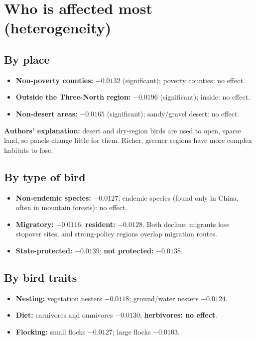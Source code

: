 \documentclass[11pt]{article}
\begin{document}
\section{Who is affected most (heterogeneity)}

\subsection{By place}
\begin{itemize}
\item \textbf{Non-poverty counties:} $-0.0132$ (significant); poverty counties: no effect.
\item \textbf{Outside the Three-North region:} $-0.0196$ (significant); inside: no effect.
\item \textbf{Non-desert areas:} $-0.0165$ (significant); sandy/gravel desert: no effect.
\end{itemize}
\textbf{Authors' explanation:} desert and dry-region birds are used to open, sparse land, so panels change little for them. Richer, greener regions have more complex habitats to lose.

\subsection{By type of bird}
\begin{itemize}
\item \textbf{Non-endemic species:} $-0.0127$; endemic species (found only in China, often in mountain forests): no effect.
\item \textbf{Migratory:} $-0.0116$; \textbf{resident:} $-0.0128$. Both decline; migrants lose stopover sites, and strong-policy regions overlap migration routes.
\item \textbf{State-protected:} $-0.0139$; \textbf{not protected:} $-0.0138$.
\end{itemize}

\subsection{By bird traits}
\begin{itemize}
\item \textbf{Nesting:} vegetation nesters $-0.0118$; ground/water nesters $-0.0124$.
\item \textbf{Diet:} carnivores and omnivores $-0.0130$; \textbf{herbivores: no effect}.
\item \textbf{Flocking:} small flocks $-0.0127$; large flocks $-0.0103$.
\end{itemize}
\end{document}
